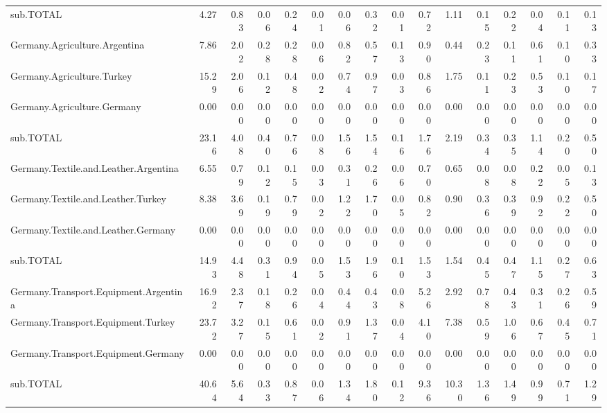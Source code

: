 \documentclass[a4paper]{article}\usepackage[]{graphicx}\usepackage[]{color}
\begin{document}
\begin{landscape}
\begin{table}[htbp]
\begin{tabular}{lrrrrrrrrrrrrrrr}
    sub.TOTAL & 4.27  & 0.83  & 0.06  & 0.24  & 0.01  & 0.06  & 0.32  & 0.01  & 0.72  & 1.11  & 0.15  & 0.22  & 0.04  & 0.11  & 0.13 \\
    Germany.Agriculture.Argentina & 7.86  & 2.02  & 0.28  & 0.28  & 0.06  & 0.82  & 0.57  & 0.13  & 0.90  & 0.44  & 0.23  & 0.11  & 0.61  & 0.10  & 0.33 \\
    Germany.Agriculture.Turkey & 15.29 & 2.06  & 0.12  & 0.48  & 0.02  & 0.74  & 0.97  & 0.03  & 0.86  & 1.75  & 0.11  & 0.23  & 0.53  & 0.10  & 0.17 \\
    Germany.Agriculture.Germany & 0.00  & 0.00  & 0.00  & 0.00  & 0.00  & 0.00  & 0.00  & 0.00  & 0.00  & 0.00  & 0.00  & 0.00  & 0.00  & 0.00  & 0.00 \\
    sub.TOTAL & 23.16 & 4.08  & 0.40  & 0.76  & 0.08  & 1.56  & 1.54  & 0.16  & 1.76  & 2.19  & 0.34  & 0.35  & 1.14  & 0.20  & 0.50 \\
    Germany.Textile.and.Leather.Argentina & 6.55  & 0.79  & 0.12  & 0.15  & 0.03  & 0.31  & 0.26  & 0.06  & 0.70  & 0.65  & 0.08  & 0.08  & 0.22  & 0.05  & 0.13 \\
    Germany.Textile.and.Leather.Turkey & 8.38  & 3.69  & 0.19  & 0.79  & 0.02  & 1.22  & 1.70  & 0.05  & 0.82  & 0.90  & 0.36  & 0.39  & 0.92  & 0.22  & 0.50 \\
    Germany.Textile.and.Leather.Germany & 0.00  & 0.00  & 0.00  & 0.00  & 0.00  & 0.00  & 0.00  & 0.00  & 0.00  & 0.00  & 0.00  & 0.00  & 0.00  & 0.00  & 0.00 \\
    sub.TOTAL & 14.93 & 4.48  & 0.31  & 0.94  & 0.05  & 1.53  & 1.96  & 0.10  & 1.53  & 1.54  & 0.45  & 0.47  & 1.15  & 0.27  & 0.63 \\
    Germany.Transport.Equipment.Argentina & 16.92 & 2.37  & 0.18  & 0.26  & 0.04  & 0.44  & 0.43  & 0.08  & 5.26  & 2.92  & 0.78  & 0.43  & 0.31  & 0.26  & 0.59 \\
    Germany.Transport.Equipment.Turkey & 23.72 & 3.27  & 0.15  & 0.61  & 0.02  & 0.91  & 1.37  & 0.04  & 4.10  & 7.38  & 0.59  & 1.06  & 0.67  & 0.45  & 0.71 \\
    Germany.Transport.Equipment.Germany & 0.00  & 0.00  & 0.00  & 0.00  & 0.00  & 0.00  & 0.00  & 0.00  & 0.00  & 0.00  & 0.00  & 0.00  & 0.00  & 0.00  & 0.00 \\
    sub.TOTAL & 40.64 & 5.64  & 0.33  & 0.87  & 0.06  & 1.34  & 1.80  & 0.12  & 9.36  & 10.30 & 1.36  & 1.49  & 0.99  & 0.71  & 1.29 \\
    \bottomrule
    \end{tabular}
\end{table}
\end{landscape}
\end{document}
